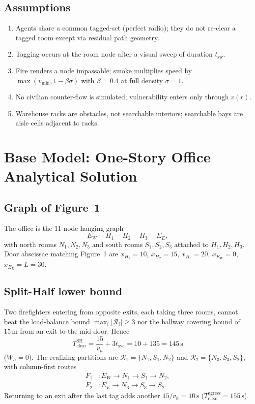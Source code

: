 \documentclass[12pt]{article}
\newcommand{\Tclear}{T_{\mathrm{clear}}}
\newcommand{\tsvc}{t_{\mathrm{svc}}}
\newcommand{\tsw}{t_{\mathrm{sw}}}
\newcommand{\whall}{v_{h}}
\begin{document}
\subsection{Assumptions}
\begin{enumerate}[leftmargin=1.4em]
  \item Agents share a common tagged-set (perfect radio); they do not re-clear a tagged
        room except via residual path geometry.
  \item Tagging occurs at the room node after a visual sweep of duration \(\tsw\).
  \item Fire renders a node impassable; smoke multiplies speed by
        \(\max(v_{\min},1-\beta\sigma)\) with \(\beta=0.4\) at full density \(\sigma=1\).
  \item No civilian counter-flow is simulated; vulnerability enters only through \(v(r)\).
  \item Warehouse racks are obstacles, not searchable interiors; searchable bays are
        aisle cells adjacent to racks.
\end{enumerate}

\section{Base Model: One-Story Office Analytical Solution}
\label{sec:req2}

\subsection{Graph of Figure~1}

The office is the 11-node hanging graph
\[
  E_W-H_1-H_2-H_3-E_E,
\]
with north rooms \(N_1,N_2,N_3\) and south rooms \(S_1,S_2,S_3\) attached to
\(H_1,H_2,H_3\). Door abscissae matching Figure~1 are
\(x_{H_1}=10\), \(x_{H_2}=15\), \(x_{H_3}=20\), \(x_{E_W}=0\), \(x_{E_E}=L=30\).

\subsection{Split-Half lower bound}

Two firefighters entering from opposite exits, each taking three rooms, cannot beat
the load-balance bound \(\max_i|\mathcal{R}_i|\ge 3\) nor the hallway covering bound
of \(15\,\mathrm{m}\) from an exit to the mid-door. Hence
\begin{equation}
  \label{eq:tsh}
  \Tclear^{\mathrm{SH}}
  = \frac{15}{\whall} + 3\tsvc
  = 10 + 135
  = 145\,\mathrm{s}
\end{equation}
(\(W_h=0\)). The realizing partitions are
\(\mathcal{R}_1=\{N_1,S_1,N_2\}\) and \(\mathcal{R}_2=\{N_3,S_3,S_2\}\), with
column-first routes
\begin{align*}
  F_1&: E_W\to N_1\to S_1\to N_2,\\
  F_2&: E_E\to N_3\to S_3\to S_2.
\end{align*}
Returning to an exit after the last tag adds another \(15/\whall=10\,\mathrm{s}\)
(\(\Tclear^{\mathrm{egress}}=155\,\mathrm{s}\)).
\end{document}
